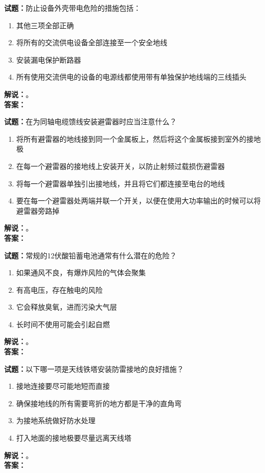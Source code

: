 \documentclass{ctexbook}
\begin{document}
\vspace{\baselineskip}

\noindent\textbf{试题：}防止设备外壳带电危险的措施包括：
\begin{enumerate}[leftmargin=3em]
  \item 其他三项全部正确
  \item 将所有的交流供电设备全部连接至一个安全地线
  \item 安装漏电保护断路器
  \item 所有使用交流供电的设备的电源线都使用带有单独保护地线端的三线插头
\end{enumerate}
\noindent\textbf{解说：}\textbf{}。\\\noindent\textbf{答案：}

\vspace{\baselineskip}

\noindent\textbf{试题：}在为同轴电缆馈线安装避雷器时应当注意什么？
\begin{enumerate}[leftmargin=3em]
  \item 将所有避雷器的地线接到同一个金属板上，然后将这个金属板接到室外的接地极
  \item 在每一个避雷器的接地线上安装开关，以防止射频过载损伤避雷器
  \item 将每一个避雷器单独引出接地线，并且将它们都连接至电台的地线
  \item 要在每一个避雷器处两端并联一个开关，以便在使用大功率输出的时候可以将避雷器旁路掉
\end{enumerate}
\noindent\textbf{解说：}\textbf{}。\\\noindent\textbf{答案：}

\vspace{\baselineskip}

\noindent\textbf{试题：}常规的12伏酸铅蓄电池通常有什么潜在的危险？
\begin{enumerate}[leftmargin=3em]
  \item 如果通风不良，有爆炸风险的气体会聚集
  \item 有高电压，存在触电的风险
  \item 它会释放臭氧，进而污染大气层
  \item 长时间不使用可能会引起自燃
\end{enumerate}
\noindent\textbf{解说：}\textbf{}。\\\noindent\textbf{答案：}

\vspace{\baselineskip}

\noindent\textbf{试题：}以下哪一项是天线铁塔安装防雷接地的良好措施？
\begin{enumerate}[leftmargin=3em]
  \item 接地连接要尽可能地短而直接
  \item 确保接地线的所有需要弯折的地方都是干净的直角弯
  \item 为接地系统做好防水处理
  \item 打入地面的接地极要尽量远离天线塔
\end{enumerate}
\noindent\textbf{解说：}\textbf{}。\\\noindent\textbf{答案：}
\end{document}
